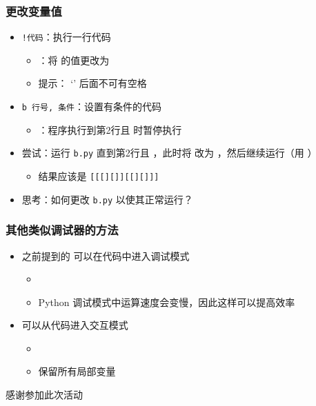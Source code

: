 \begin{CJK}{UTF8}{gbsn}
\begin{frame} [fragile]
	\frametitle{更改变量值}
	\linespread{1.25}
	\begin{itemize}
	\item \texttt{!代码}：执行一行代码
		\begin{itemize}
		\item {}：将  的值更改为 
		\item 提示： `\inlinePython{!}' 后面不可有空格
		\end{itemize}
	\item \texttt{b 行号, 条件}：设置有条件的代码
		\begin{itemize}
		\item {}：程序执行到第2行且  时暂停执行
		\end{itemize}
	\item 尝试：运行 \texttt{b.py} 直到第2行且  ，此时将
				 改为  ，然后继续运行（用 
				 ）
		\begin{itemize}
		\item 结果应该是 \texttt{[[[][]][[][]]]}
		\end{itemize}
	\item 思考：如何更改 \texttt{b.py} 以使其正常运行？
	\end{itemize}
	\begin{comment}
	b 2, x == -3
	r
	p x			# -3
	!x = 0
	c
	\end{comment}
\end{frame}

\begin{frame} [fragile]
	\frametitle{其他类似调试器的方法}
	\linespread{1.5}
	\begin{itemize}
	\item 之前提到的  可以在代码中进入调试模式
		\begin{itemize}
		\item {}
		\item Python 调试模式中运算速度会变慢，因此这样可以提高效率
		\end{itemize}
	\item {} 可以从代码进入交互模式
		\begin{itemize}
		\item {}
		\item {} 保留所有局部变量
		\end{itemize}
	\end{itemize}
\end{frame}

\PreLastFrame
\begin{frame}
	\centerline{\fontsize{32}{32}\selectfont 感谢参加此次活动}
\end{frame}

\newpage
\end{CJK}


